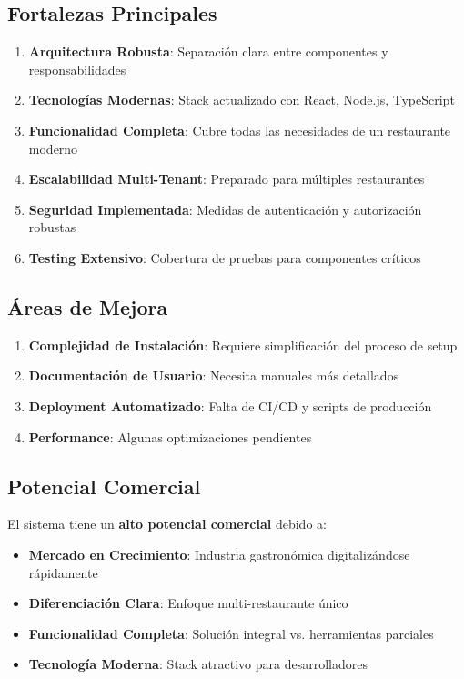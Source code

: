 \documentclass[12pt,a4paper]{article}
\begin{document}
\subsection{Fortalezas Principales}

\begin{enumerate}
    \item \textbf{Arquitectura Robusta}: Separación clara entre componentes y responsabilidades
    \item \textbf{Tecnologías Modernas}: Stack actualizado con React, Node.js, TypeScript
    \item \textbf{Funcionalidad Completa}: Cubre todas las necesidades de un restaurante moderno
    \item \textbf{Escalabilidad Multi-Tenant}: Preparado para múltiples restaurantes
    \item \textbf{Seguridad Implementada}: Medidas de autenticación y autorización robustas
    \item \textbf{Testing Extensivo}: Cobertura de pruebas para componentes críticos
\end{enumerate}

\subsection{Áreas de Mejora}

\begin{enumerate}
    \item \textbf{Complejidad de Instalación}: Requiere simplificación del proceso de setup
    \item \textbf{Documentación de Usuario}: Necesita manuales más detallados
    \item \textbf{Deployment Automatizado}: Falta de CI/CD y scripts de producción
    \item \textbf{Performance}: Algunas optimizaciones pendientes
\end{enumerate}

\subsection{Potencial Comercial}

El sistema tiene un \textbf{alto potencial comercial} debido a:

\begin{itemize}
    \item \textbf{Mercado en Crecimiento}: Industria gastronómica digitalizándose rápidamente
    \item \textbf{Diferenciación Clara}: Enfoque multi-restaurante único
    \item \textbf{Funcionalidad Completa}: Solución integral vs. herramientas parciales
    \item \textbf{Tecnología Moderna}: Stack atractivo para desarrolladores
\end{itemize}
\end{document}
